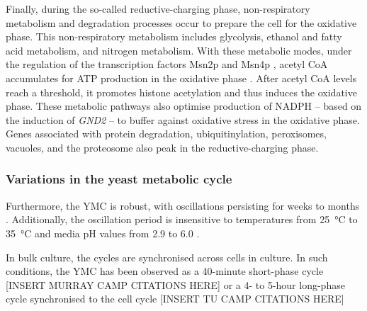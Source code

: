 Finally, during the so-called reductive-charging phase,
non-respiratory metabolism and degradation processes occur to prepare the cell for the oxidative phase.
This non-respiratory metabolism includes glycolysis, ethanol and fatty acid metabolism, and nitrogen metabolism.
With these metabolic modes, under the regulation of the transcription factors Msn2p and Msn4p \citep{kuangMsn2RegulateExpression2017}, acetyl CoA accumulates for ATP production in the oxidative phase \citep{tuLogicYeastMetabolic2005}.
After acetyl CoA levels reach a threshold, it promotes histone acetylation and thus induces the oxidative phase.
These metabolic pathways also optimise production of NADPH -- based on the induction of \emph{GND2} -- to buffer against oxidative stress in the oxidative phase.
Genes associated with protein degradation, ubiquitinylation, peroxisomes, vacuoles, and the proteosome also peak in the reductive-charging phase.

\subsubsection{Variations in the yeast metabolic cycle} %
\label{subsubsec:intro-ymc-definition-variation}

Furthermore, the YMC is robust, with oscillations persisting for weeks to months \citep{lloydRedoxRhythmicityClocks2007}.
Additionally, the oscillation period is insensitive to temperatures from \SI{25}{\celsius} to \SI{35}{\celsius} and media pH values from
2.9 to 6.0 \citep{lloydUltradianMetronomeTimekeeper2005}.

In bulk culture,
the cycles are synchronised across cells in culture.
In such conditions, the YMC has been observed as a
40-minute short-phase cycle [INSERT MURRAY CAMP CITATIONS HERE] or
a 4- to 5-hour long-phase cycle synchronised to the cell cycle [INSERT TU CAMP CITATIONS HERE]


